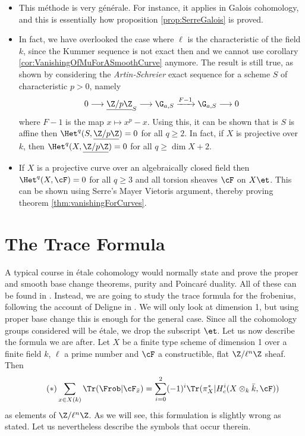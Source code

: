 \begin{remark} $ $
\begin{itemize}
\item 
This m\'ethode is very g\'en\'erale. For instance, it applies in Galois cohomology, and this is essentially how proposition \ref{prop:SerreGalois} is proved.
\item
In fact, we have overlooked the case where $\ell$ is the characteristic of the field $k$, since the Kummer sequence is not exact then and we cannot use corollary \ref{cor:VanishingOfMuForASmoothCurve} anymore. The result is still true, as shown by considering the \emph{Artin-Schreier} exact sequence for a scheme $S$ of characteristic $p >0$, namely
$$
0 \longrightarrow \underline{\Z/p\Z}_S \longrightarrow \G_{a,S} \xrightarrow{F-1} \G_{a,S} \longrightarrow 0
$$
where $F-1$ is the map $x \mapsto x^p - x$. Using this, it can be shown that is $S$ is affine then $\Het^q(S,\underline{\Z/p\Z}) = 0$ for all $q \geqslant 2$. In fact, if $X$ is projective over $k$, then $\Het^q(X,\underline{\Z/p\Z}) = 0$ for all $q \geqslant \dim X+2$.
\item
If $X$ is a projective curve over an algebraically closed field then $\Het^q(X,\cF) = 0$ for all $q \geqslant 3$ and all torsion sheaves $\cF$ on $X\et$. This can be shown using Serre's Mayer Vietoris argument, thereby proving theorem \ref{thm:vanishingForCurves}.
\end{itemize}
\end{remark}\section{The Trace Formula}

A typical course in \'etale cohomology would normally state and prove the proper and smooth base change theorems, purity and Poincar\'e duality. All of these can be found in \cite[Arcata]{SGA4.5}. Instead, we are going to study the trace formula for the frobenius, following the account of Deligne in \cite[Rapport]{SGA4.5}. We will only look at dimension 1, but using proper base change this is enough for the general case. Since all the cohomology groups considered will be \'etale, we drop the subscript $\et$. Let us now describe the formula we are after. Let $X$ be a finite type scheme of dimension 1 over a finite field $k$, $\ell$ a prime number and $\cF$ a constructible, flat $\Z/\ell^n\Z$ sheaf. Then
\begin{equation*} \tag{$*$} \label{eq:TraceFormula}
\sum_{x \in X(k)} \Tr(\Frob | \cF_{\bar x}) = \sum_{i=0}^2 (-1)^i \Tr(\pi_X^* | H^i_c(X\otimes_k \bar k, \cF))
\end{equation*}
as elements of $\Z/\ell^n\Z$. As we will see, this formulation is slightly wrong as stated. Let us nevertheless describe the symbols that occur therein.

